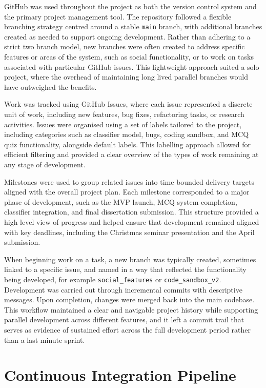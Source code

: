GitHub was used throughout the project as both the version control system
and the primary project management tool. The repository followed a flexible
branching strategy centred around a stable \texttt{main} branch, with
additional branches created as needed to support ongoing development.
Rather than adhering to a strict two branch model, new branches were often
created to address specific features or areas of the system, such as social
functionality, or to work on tasks associated with particular GitHub
issues. This lightweight approach suited a solo project, where the
overhead of maintaining long lived parallel branches would have outweighed
the benefits.

Work was tracked using GitHub Issues, where each issue represented a
discrete unit of work, including new features, bug fixes, refactoring
tasks, or research activities. Issues were organised using a set of labels
tailored to the project, including categories such as classifier model,
bugs, coding sandbox, and MCQ quiz functionality, alongside default labels.
This labelling approach allowed for efficient filtering and provided a
clear overview of the types of work remaining at any stage of development.

Milestones were used to group related issues into time bounded delivery
targets aligned with the overall project plan. Each milestone corresponded
to a major phase of development, such as the MVP launch, MCQ system
completion, classifier integration, and final dissertation submission.
This structure provided a high level view of progress and helped ensure
that development remained aligned with key deadlines, including the
Christmas seminar presentation and the April submission.

When beginning work on a task, a new branch was typically created,
sometimes linked to a specific issue, and named in a way that reflected
the functionality being developed, for example \texttt{social\_features}
or \texttt{code\_sandbox\_v2}. Development was carried out through
incremental commits with descriptive messages. Upon completion, changes
were merged back into the main codebase. This workflow maintained a clear
and navigable project history while supporting parallel development across
different features, and it left a commit trail that serves as evidence of
sustained effort across the full development period rather than a last
minute sprint.

\section{Continuous Integration Pipeline}

